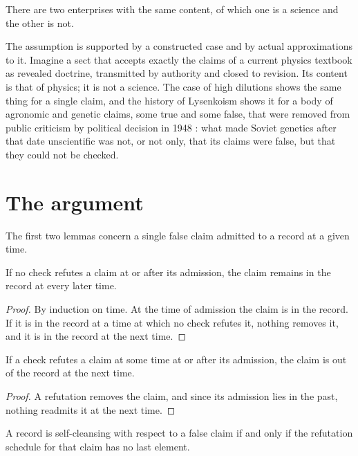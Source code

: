 \documentclass{situationist-preprint}
\begin{document}
\begin{assumption}\label{a:twins}
There are two enterprises with the same content, of which one is a science and the other is not.
\end{assumption}

The assumption is supported by a constructed case and by actual approximations to it. Imagine a sect that accepts exactly the claims of a current physics textbook as revealed doctrine, transmitted by authority and closed to revision. Its content is that of physics; it is not a science. The case of high dilutions shows the same thing for a single claim, and the history of Lysenkoism shows it for a body of agronomic and genetic claims, some true and some false, that were removed from public criticism by political decision in 1948 \citep{Joravsky1970}: what made Soviet genetics after that date unscientific was not, or not only, that its claims were false, but that they could not be checked.

\section{The argument}\label{s:argument}

The first two lemmas concern a single false claim admitted to a record at a given time.

\begin{lemma}[Persistence]\label{l:persist}
If no check refutes a claim at or after its admission, the claim remains in the record at every later time.
\end{lemma}

\begin{proof}
By induction on time. At the time of admission the claim is in the record. If it is in the record at a time at which no check refutes it, nothing removes it, and it is in the record at the next time.
\end{proof}

\begin{lemma}[Elimination]\label{l:elim}
If a check refutes a claim at some time at or after its admission, the claim is out of the record at the next time.
\end{lemma}

\begin{proof}
A refutation removes the claim, and since its admission lies in the past, nothing readmits it at the next time.
\end{proof}

\begin{theorem}\label{t:char}
A record is self-cleansing with respect to a false claim if and only if the refutation schedule for that claim has no last element.
\end{theorem}
\end{document}
